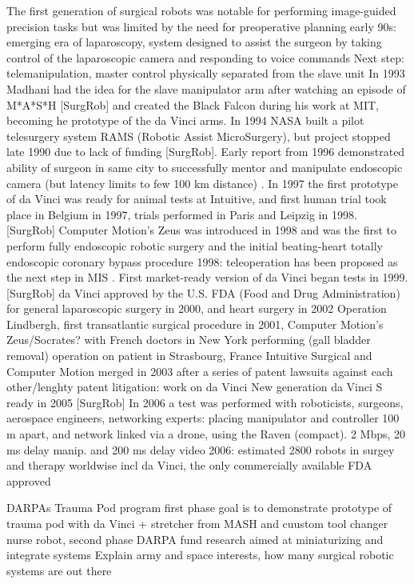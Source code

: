 The first generation of surgical robots was notable for performing image-guided precision tasks but was limited by the need for preoperative planning
early 90s: emerging era of laparoscopy, system designed to assist the surgeon by taking control of the laparoscopic camera and responding to voice commands
Next step: telemanipulation, master control physically separated from the slave unit
In 1993 Madhani had the idea for the slave manipulator arm after watching an episode of M*A*S*H [SurgRob] and created the Black Falcon during his work at MIT, becoming he prototype of the da Vinci arms.
In 1994 NASA built a pilot telesurgery system RAMS (Robotic Assist MicroSurgery), but project stopped late 1990 due to lack of funding [SurgRob].
Early report from 1996 demonstrated ability of surgeon in same city to successfully mentor and manipulate endoscopic camera (but latency limits to few 100 km distance) \citep{bib:telesurg_history}.
In 1997 the first prototype of da Vinci was ready for animal tests at Intuitive, and first human trial took place in Belgium in 1997, trials performed in Paris and Leipzig in 1998. [SurgRob]
Computer Motion's Zeus was introduced in 1998 and was the first to perform fully endoscopic robotic surgery and the initial beating-heart totally endoscopic coronary bypass procedure \citep{bib:brown_univ}
1998: teleoperation has been proposed as the next step in MIS \citep{bib:black_falcon}.
First market-ready version of da Vinci began tests in 1999. [SurgRob]
da Vinci approved by the U.S. FDA (Food and Drug Administration) for general laparoscopic surgery in 2000, and heart surgery in 2002 \citep{bib:brown_univ}
Operation Lindbergh, first transatlantic surgical procedure in 2001, Computer Motion's Zeus/Socrates? with French doctors in New York performing (gall bladder removal) operation on patient in Strasbourg, France
Intuitive Surgical and Computer Motion merged in 2003 after a series of patent lawsuits against each other/lenghty patent litigation: work on da Vinci
New generation da Vinci S ready in 2005 [SurgRob]
In 2006 a test was performed with roboticists, surgeons, aerospace engineers, networking experts: placing manipulator and controller 100 m apart, and network linked via a drone, using the Raven \citep{bib:docatadist} (compact). 2 Mbps, 20 ms delay manip. and 200 ms delay video
2006: estimated 2800 robots in surgey and therapy worldwise incl da Vinci, the only commercially available FDA approved

DARPAs Trauma Pod program first phase goal is to demonstrate prototype of trauma pod with da Vinci + stretcher from MASH and cuustom tool changer nurse robot, second phase DARPA fund research aimed at miniaturizing and integrate systems \citep{bib:docatadist}
Explain army and space interests, how many surgical robotic systems are out there

